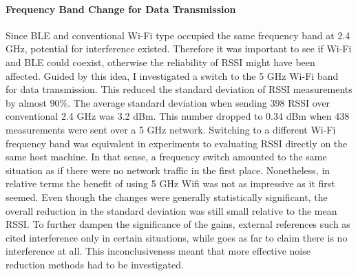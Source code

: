 \documentclass[a4paper, oneside]{ipsreport}
\begin{document}
\paragraph{Frequency Band Change for Data Transmission}
Since BLE and conventional Wi-Fi type occupied the same frequency band at 2.4 GHz, potential for interference existed. Therefore it was important to see if Wi-Fi and BLE could coexist, otherwise the reliability of RSSI might have been affected. Guided by this idea, I investigated a switch to the 5 GHz Wi-Fi band for data transmission. This reduced the standard deviation of RSSI measurements by almost 90\%. The average standard deviation when sending 398 RSSI over conventional 2.4 GHz was 3.2 dBm. This number dropped to 0.34 dBm when 438 measurements were sent over a 5 GHz network. Switching to a different Wi-Fi frequency band was equivalent in experiments to evaluating RSSI directly on the same host machine. In that sense, a frequency switch amounted to the same situation as if there were no network traffic in the first place. Nonetheless, in relative terms the benefit of using 5 GHz Wifi was not as impressive as it first seemed. Even though the changes were generally statistically significant, the overall reduction in the standard deviation was still small relative to the mean RSSI. To further dampen the significance of the gains, external references such as \cite{WifiBluetoothInterferenceMathworks, WifiBluetoothInterferenceApple} cited interference only in certain situations, while \cite{BLEWifiCoexistence} goes as far to claim there is no interference at all. This inconclusiveness meant that more effective noise reduction methods had to be investigated.
\end{document}
